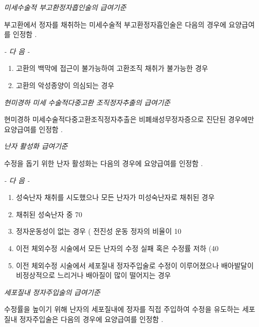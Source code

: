 \emph{미세수술적 부고환정자흡인술의 급여기준}\par 
부고환에서 정자를 채취하는 미세수술적 부고환정자흡인술은 다음의 경우에 요양급여를 인정함 . \par

\emph{-  다 음  -}\par 
\begin{enumerate}[가.]\tightlist
\item 고환의 백막에 접근이 불가능하여 고환조직 채취가 불가능한 경우 
\item 고환의 악성종양이 의심되는 경우 
\end{enumerate} 

\emph{현미경하 미세 수술적다중고환 조직정자추출의 급여기준}\par 
현미경하 미세수술적다중고환조직정자추출은 비폐쇄성무정자증으로 진단된 경우에만 요양급여를 인정함 . \par

\par  
\emph{난자 활성화 급여기준}\par 
수정을 돕기 위한 난자 활성화는 다음의 경우에 요양급여를 인정함 . \par

\emph{-  다 음  -}\par  
\begin{enumerate}[가.]\tightlist
\item 성숙난자 채취를 시도했으나 모든 난자가 미성숙난자로 채취된 경우 
\item 채취된 성숙난자 중  70%
\item 정자운동성이 없는 경우 ( 전진성 운동 정자의 비율이  10%
\item 이전 체외수정 시술에서 모든 난자의 수정 실패 혹은 수정률  저하 (40%
\item 이전 체외수정 시술에서 세포질내 정자주입술로 수정이  이루어졌으나 배아발달이 비정상적으로 느리거나 배아질이  많이 떨어지는 경우 
\end{enumerate} 

\par 
\emph{세포질내  정자주입술의  급여기준} \par 
수정률을 높이기 위해 난자의 세포질내에 정자를 직접 주입하여 수정을 유도하는 세포질내 정자주입술은 다음의 경우에 요양급여를 인정함 . \par

